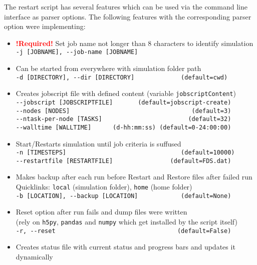 The restart script has several features which can be used via the command line interface as parser options. The following features with the corresponding parser option were implementing:
\begin{itemize}
    \item \textbf{\textcolor{red}{!Required!}} Set job name not longer than 8 characters to identify simulation\\
          \texttt{-j [JOBNAME], -\/-job-name [JOBNAME]}
    \item Can be started from everywhere with simulation folder path\\
          \texttt{-d [DIRECTORY], -\/-dir [DIRECTORY]~~~~~~~~~~~~~(default=cwd)}
    \item Creates jobscript file with defined content (variable \texttt{jobscriptContent})\\
          \texttt{-\/-jobscript [JOBSCRIPTFILE]~~~~~~~(default=jobscript-create)}\\
          \texttt{-\/-nodes [NODES]~~~~~~~~~~~~~~~~~~~~~~~~~~~~~~~~~~(default=3)}\\
          \texttt{-\/-ntask-per-node [TASKS]~~~~~~~~~~~~~~~~~~~~~~~~(default=32)}\\
          \texttt{-\/-walltime [WALLTIME]~~~~~~(d-hh:mm:ss)~(default=0-24:00:00)}
    \item Start/Restarts simulation until job criteria is suffused\\
          \texttt{-n [TIMESTEPS]~~~~~~~~~~~~~~~~~~~~~~~~~~~~~~\,\,(default=10000)}\\
          \texttt{-\/-restartfile [RESTARTFILE]~~~~~~~~~~~~~~~~(default=FDS.dat)}
    \item Makes backup after each run before Restart and Restore files after failed run\\
          Quicklinks: \texttt{local} (simulation folder), \texttt{home} (home folder) \\
          \texttt{-b [LOCATION], -\/-backup [LOCATION]~~~~~~~~~~~\,(default=None)}
    \item Reset option after run fails and dump files were written\\
          (rely on \texttt{h5py}, \texttt{pandas} and \texttt{numpy} which get installed by the script itself)\\
          \texttt{-r, -\/-reset~~~~~~~~~~~~~~~~~~~~~~~~~~~~~~~~~\,(default=False)}
    \item Creates status file with current status and progress bars and updates it dynamically\\

\end{itemize}
